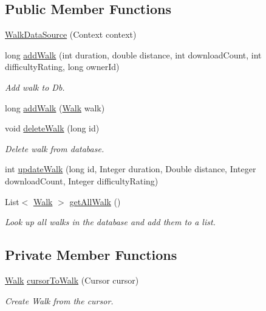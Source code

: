 \subsection*{Public Member Functions}
\begin{DoxyCompactItemize}
\item 
\hyperlink{classuk_1_1ac_1_1swan_1_1digitaltrails_1_1database_1_1_walk_data_source_a60301a5dc7794307ade6df34bd239eb2}{Walk\+Data\+Source} (Context context)
\item 
long \hyperlink{classuk_1_1ac_1_1swan_1_1digitaltrails_1_1database_1_1_walk_data_source_a404fe1da8769d8d3fc50e8c43c52bbf2}{add\+Walk} (int duration, double distance, int download\+Count, int difficulty\+Rating, long owner\+Id)
\begin{DoxyCompactList}\small\item\em Add walk to Db. \end{DoxyCompactList}\item 
long \hyperlink{classuk_1_1ac_1_1swan_1_1digitaltrails_1_1database_1_1_walk_data_source_a9b1ff0450785979c68e1668c4aec17ce}{add\+Walk} (\hyperlink{classuk_1_1ac_1_1swan_1_1digitaltrails_1_1components_1_1_walk}{Walk} walk)
\item 
void \hyperlink{classuk_1_1ac_1_1swan_1_1digitaltrails_1_1database_1_1_walk_data_source_ac568c3ebb851069f4b1d0b74204d933c}{delete\+Walk} (long id)
\begin{DoxyCompactList}\small\item\em Delete walk from database. \end{DoxyCompactList}\item 
int \hyperlink{classuk_1_1ac_1_1swan_1_1digitaltrails_1_1database_1_1_walk_data_source_a737d975ddc892d0202d0c9c70f47ea42}{update\+Walk} (long id, Integer duration, Double distance, Integer download\+Count, Integer difficulty\+Rating)
\item 
List$<$ \hyperlink{classuk_1_1ac_1_1swan_1_1digitaltrails_1_1components_1_1_walk}{Walk} $>$ \hyperlink{classuk_1_1ac_1_1swan_1_1digitaltrails_1_1database_1_1_walk_data_source_a0d66b2a623c0e8e11a995a5c4060a30f}{get\+All\+Walk} ()
\begin{DoxyCompactList}\small\item\em Look up all walks in the database and add them to a list. \end{DoxyCompactList}\end{DoxyCompactItemize}
\subsection*{Private Member Functions}
\begin{DoxyCompactItemize}
\item 
\hyperlink{classuk_1_1ac_1_1swan_1_1digitaltrails_1_1components_1_1_walk}{Walk} \hyperlink{classuk_1_1ac_1_1swan_1_1digitaltrails_1_1database_1_1_walk_data_source_a3b6093677528b27fccafa4f20febe4b2}{cursor\+To\+Walk} (Cursor cursor)
\begin{DoxyCompactList}\small\item\em Create Walk from the cursor. \end{DoxyCompactList}\end{DoxyCompactItemize}
